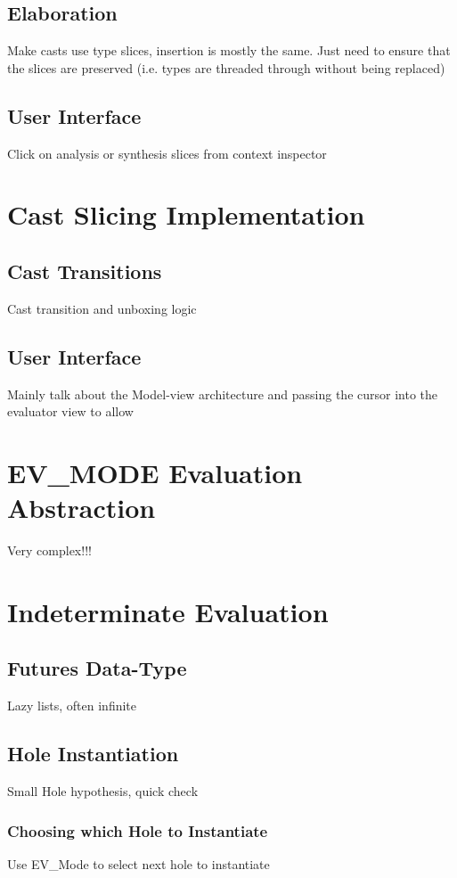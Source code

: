 \subsection{Elaboration}\label{sec:Elaboration}
Make casts use type slices, insertion is mostly the same. Just need to ensure that the slices are preserved (i.e. types are threaded through without being replaced)

\subsection{User Interface}
Click on analysis or synthesis slices from context inspector

\section{Cast Slicing Implementation}\label{sec:CastSlicingImplementation}
\subsection{Cast Transitions}

Cast transition and unboxing logic

\subsection{User Interface}
Mainly talk about the Model-view architecture and passing the cursor into the evaluator view to allow 


\section{EV\_MODE Evaluation Abstraction}
Very complex!!!

\section{Indeterminate Evaluation}\label{sec:IndetEval}
\subsection{Futures Data-Type}\label{sec:Futures}
Lazy lists, often infinite
\subsection{Hole Instantiation}\label{sec:HoleInstantiation}
Small Hole hypothesis, quick check


\subsubsection{Choosing which Hole to Instantiate}
Use EV\_Mode to select next hole to instantiate

